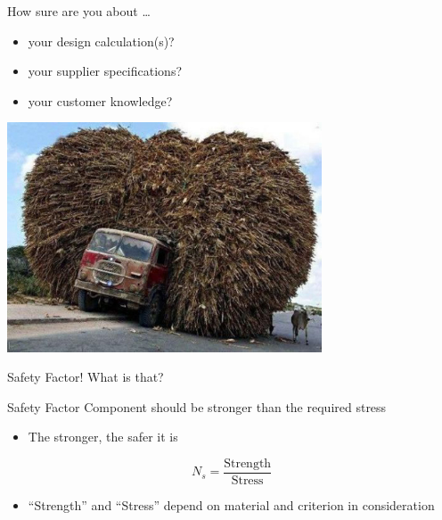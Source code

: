 \documentclass[10pt, svgnames]{beamer}
\begin{document}
\begin{frame}[label={sec:org703e230}]{How sure are you about \ldots{}}
\begin{itemize}
\item your design calculation(s)?
\end{itemize}


\begin{itemize}
\item your supplier specifications?
\end{itemize}


\begin{itemize}
\item your customer knowledge?
\end{itemize}


\begin{center}
  \includegraphics[width=0.7\textwidth]{./pictures/overloaded-truck.jpg}
\end{center}
\end{frame}

\begin{frame}[label={sec:org3bd6746}]{Safety Factor!}
\alert{What is that?}
\end{frame}

\begin{frame}[label={sec:org72bf0b6}]{Safety Factor}
Component should be stronger than the required stress


\begin{itemize}
\item The stronger, the safer it is
\end{itemize}

$$ N_s = \frac{\text{Strength}}{\text{Stress}} $$
\begin{itemize}
\item ``Strength'' and ``Stress'' depend on material and criterion in consideration
\end{itemize}
\end{frame}
\end{document}
